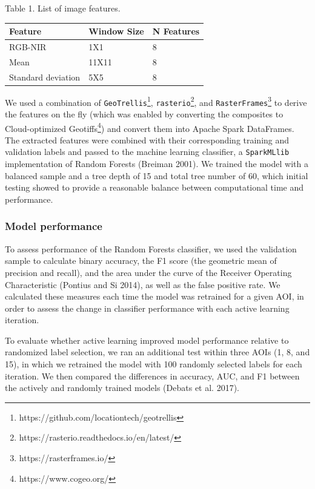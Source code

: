 \documentclass[11pt,a4paper]{article}
\begin{document}
\begin{center}Table 1. List of image features.\end{center}

\begin{longtable}[]{@{}lll@{}}
\toprule
Feature & Window Size & N Features \\
\midrule
\endhead
RGB-NIR & 1X1 & 8 \\
Mean & 11X11 & 8 \\
Standard deviation & 5X5 & 8 \\
\bottomrule
\end{longtable}

We used a combination of
\texttt{GeoTrellis}\footnote{https://github.com/locationtech/geotrellis},
\texttt{rasterio}\footnote{https://rasterio.readthedocs.io/en/latest/},
and \texttt{RasterFrames}\footnote{https://rasterframes.io/} to derive
the features on the fly (which was enabled by converting the composites
to Cloud-optimized Geotiffs\footnote{https://www.cogeo.org/}) and
convert them into Apache Spark DataFrames. The extracted features were
combined with their corresponding training and validation labels and
passed to the machine learning classifier, a \texttt{SparkMLlib}
implementation of Random Forests (Breiman 2001). We trained the model
with a balanced sample and a tree depth of 15 and total tree number of
60, which initial testing showed to provide a reasonable balance between
computational time and performance.

\hypertarget{model-performance}{%
\subsubsection{Model performance}\label{model-performance}}

To assess performance of the Random Forests classifier, we used the
validation sample to calculate binary accuracy, the F1 score (the
geometric mean of precision and recall), and the area under the curve of
the Receiver Operating Characteristic (Pontius and Si 2014), as well as
the false positive rate. We calculated these measures each time the
model was retrained for a given AOI, in order to assess the change in
classifier performance with each active learning iteration.

To evaluate whether active learning improved model performance relative
to randomized label selection, we ran an additional test within three
AOIs (1, 8, and 15), in which we retrained the model with 100 randomly
selected labels for each iteration. We then compared the differences in
accuracy, AUC, and F1 between the actively and randomly trained models
(Debats et al. 2017).
\end{document}
